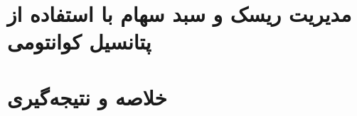 \documentclass[a4paper,titlepage,12pt,fleqn,oneside]{report}
\begin{document}
\chapter{مدیریت ریسک و  سبد سهام با استفاده از پتانسیل کوانتومی}




\chapter{خلاصه و نتیجه‌گیری}
\end{document}
